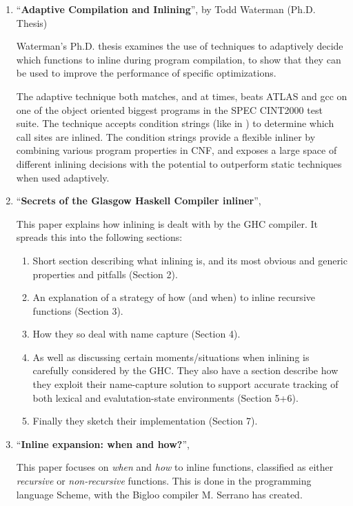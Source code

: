 \begin{enumerate}

	\item ``\textbf{Adaptive Compilation and Inlining}'', by Todd
Waterman (Ph.D. Thesis)

Waterman's Ph.D. thesis \cite{AdaptvCompilAndInlingWaterman} examines the use of
techniques to adaptively decide which functions to inline during program
compilation, to show that they can be used to improve the performance of
specific optimizations.

The adaptive technique both matches, and at times, beats ATLAS  and gcc on one of the object oriented biggest programs in the SPEC
CINT2000 test suite. The technique accepts condition strings (like in
\cite{AutoTuningJavaHeuristics}) to determine which call sites are inlined. The
condition strings provide a flexible inliner by combining various program
properties in CNF, and exposes a large space of different inlining decisions
with the potential to outperform static techniques when used adaptively.

	\item ``\textbf{Secrets of the Glasgow Haskell Compiler inliner}'',
\cite{GHCPaper}

This paper explains how inlining is dealt with by the GHC compiler. It spreads
this into the following sections:
\begin{enumerate}
	\item Short section describing what inlining is, and its most obvious and
generic properties and pitfalls (Section 2).
	\item An explanation of a strategy of how (and when) to inline recursive
functions (Section 3).
	\item How they so deal with name capture (Section 4).
	\item As well as discussing certain moments/situations when inlining is
carefully considered by the GHC. They also have a section describe how they
exploit their name-capture solution to support accurate tracking of both lexical
and evalutation-state environments (Section 5+6).
	\item Finally they sketch their implementation (Section 7).
\end{enumerate}

	\item ``\textbf{Inline expansion: when and how?}'',
\cite{InlineWhenHowSerrano}

This paper focuses on \textit{when} and \textit{how} to inline functions,
classified as either \textit{recursive} or \textit{non-recursive} functions.
This is done in the programming language Scheme, with the
Bigloo compiler M. Serrano has created.


\end{enumerate}
